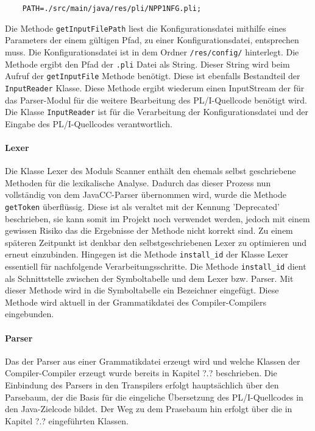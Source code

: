 \begin{verbatim}
	PATH=./src/main/java/res/pli/NPP1NFG.pli;
\end{verbatim}

Die Methode \verb+getInputFilePath+ liest die Konfigurationsdatei mithilfe eines Parameters der einem gültigen Pfad, zu einer Konfigurationsdatei,
entsprechen muss. Die Konfigurationsdatei ist in dem Ordner \verb+/res/config/+ hinterlegt. 
Die Methode ergibt den Pfad der \verb+.pli+ Datei als String. Dieser String wird beim Aufruf der \verb+getInputFile+ Methode benötigt. Diese ist ebenfalls Bestandteil der \verb+InputReader+ Klasse. Diese Methode ergibt wiederum einen InputStream der für das Parser-Modul für die weitere Bearbeitung des PL/I-Quellcode benötigt wird. Die Klasse \verb+InputReader+ ist für die Verarbeitung der Konfigurationsdatei und der Eingabe des PL/I-Quellcodes verantwortlich.

\paragraph{Lexer}
Die Klasse Lexer des Moduls Scanner enthält den ehemals selbst geschriebene Methoden für die lexikalische Analyse. Dadurch das dieser Prozess nun vollständig von dem JavaCC-Parser übernommen wird, wurde die Methode \verb+getToken+ überflüssig. Diese ist als veraltet mit der Kennung 'Deprecated' beschrieben, sie kann somit im Projekt noch verwendet werden, jedoch mit einem gewissen Risiko das die Ergebnisse der Methode nicht korrekt sind. Zu einem späteren Zeitpunkt ist denkbar den selbstgeschriebenen Lexer zu optimieren und erneut einzubinden. 
Hingegen ist die Methode \verb+install_id+ der Klasse Lexer essentiell für nachfolgende Verarbeitungsschritte.
Die Methode \verb+install_id+ dient als Schnittstelle zwischen der Symboltabelle und dem Lexer bzw. Parser. Mit dieser Methode wird in die Symboltabelle ein Bezeichner eingefügt. Diese Methode wird aktuell in der Grammatikdatei des Compiler-Compilers eingebunden.

\paragraph{Parser}
Das der Parser aus einer Grammatikdatei erzeugt wird und welche Klassen der Compiler-Compiler erzeugt wurde bereits in Kapitel ?.?
beschrieben. Die Einbindung des Parsers in den Transpilers erfolgt hauptsächlich über den Parsebaum, der die Basis für die eingeliche Übersetzung des PL/I-Quellcodes in den Java-Zielcode bildet. Der Weg zu dem Prasebaum hin erfolgt über die in Kapitel ?.? eingeführten Klassen.



